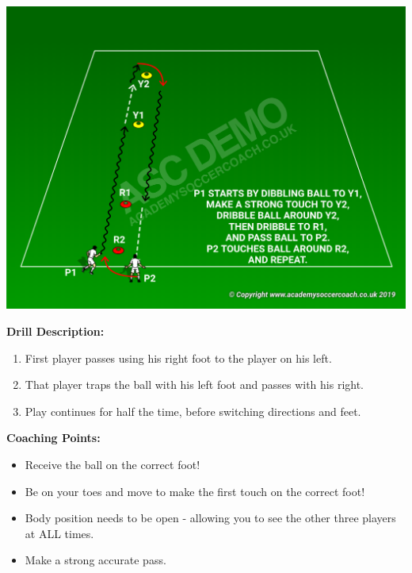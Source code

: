 \documentclass[10pt,letterpaper]{article}
\newenvironment{oddBlock}[1]{%
    \tcolorbox[beamer,%
    noparskip,breakable,
    colback=LightBlue,colframe=DarkBlue,%
    colbacklower=DarkBlue!75!LightBlue,%
    title=#1]}%
    {\endtcolorbox}
\begin{document}
\begin{oddBlock}{Role Playing game Situations}

\begin{minipage}[t]{\linewidth}
    \centering
    
    \begin{minipage}{.3\linewidth} %
            \includegraphics[width=\textwidth]{../img/Play1.png}
    \end{minipage}
    \hspace{0.05\linewidth}
    \begin{minipage}{.6\linewidth} %
        \textbf{Drill Description:}
        \begin{enumerate}
        \setlength{\itemsep}{0pt}
        \setlength{\parskip}{0pt}
        \setlength{\parsep}{0pt}
        \item First player passes using his right foot to the player on his left.
        \item That player traps the ball with his left foot and passes with his right.
        \item Play continues for half the time, before switching directions and feet.
        \end{enumerate}

        \textbf{Coaching Points:}
        \begin{itemize}
        \setlength{\itemsep}{0pt}
        \setlength{\parskip}{0pt}
        \setlength{\parsep}{0pt}
        \item Receive the ball on the correct foot!
        \item Be on your toes and move to make the first touch on the correct foot!
        \item Body position needs to be open - allowing you to see the other three players at ALL times.
        \item Make a strong accurate pass.
        \end{itemize}


\end{minipage}
\end{minipage}
\end{oddBlock}
\end{document}
